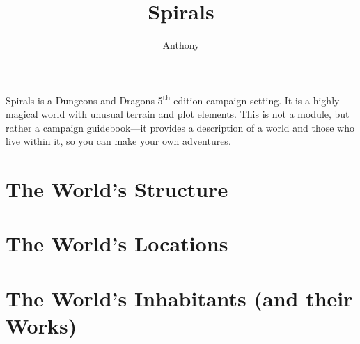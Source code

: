 \documentclass[a4paper]{book}
\title{Spirals}
\author{Anthony \censor{Super}}
\begin{document}
\setcounter{tocdepth}{1}
\maketitle
Spirals is a Dungeons and Dragons 5\textsuperscript{th} edition campaign setting.
It is a highly magical world with unusual terrain and plot elements.
This is not a module, but rather a campaign guidebook---it provides a description of a world and those who live within it, so you can make your own adventures.
\listoftodos
\tableofcontents 

\part{The World's Structure}


\part{The World's Locations}



\part{The World's Inhabitants (and their Works)}



\end{document}
